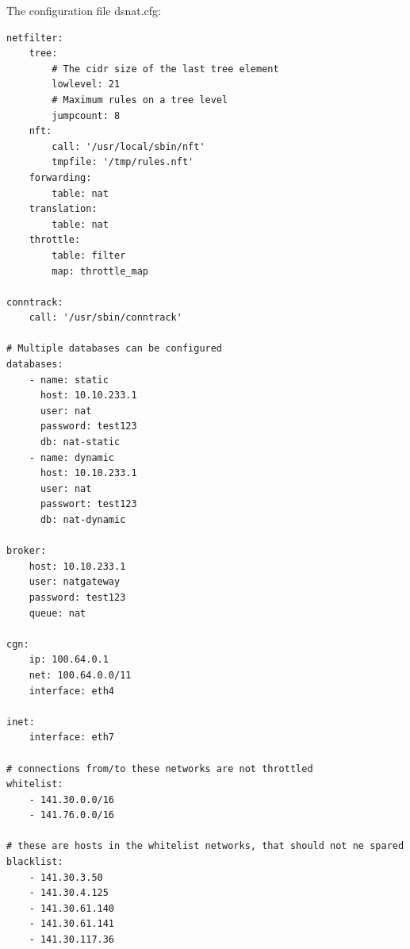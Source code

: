\documentclass{report}
\begin{document}
The configuration file dsnat.cfg:

\begingroup
\fontsize{9pt}{9pt}\selectfont
\begin{verbatim}
netfilter:
    tree:
        # The cidr size of the last tree element
        lowlevel: 21
        # Maximum rules on a tree level
        jumpcount: 8
    nft:
        call: '/usr/local/sbin/nft'
        tmpfile: '/tmp/rules.nft'
    forwarding:
        table: nat
    translation:
        table: nat
    throttle:
        table: filter
        map: throttle_map

conntrack:
    call: '/usr/sbin/conntrack'

# Multiple databases can be configured
databases:
    - name: static
      host: 10.10.233.1
      user: nat
      password: test123
      db: nat-static
    - name: dynamic
      host: 10.10.233.1
      user: nat
      passwort: test123
      db: nat-dynamic

broker:
    host: 10.10.233.1
    user: natgateway
    password: test123
    queue: nat

cgn:
    ip: 100.64.0.1
    net: 100.64.0.0/11
    interface: eth4

inet:
    interface: eth7

# connections from/to these networks are not throttled
whitelist:
    - 141.30.0.0/16
    - 141.76.0.0/16

# these are hosts in the whitelist networks, that should not ne spared
blacklist:
    - 141.30.3.50
    - 141.30.4.125
    - 141.30.61.140
    - 141.30.61.141
    - 141.30.117.36
\end{verbatim}
\endgroup


{}

\end{document}
